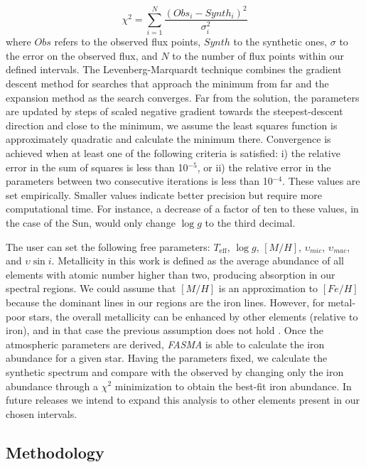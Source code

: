 \documentclass[fleqn,usenatbib]{mnras}
\begin{document}
\begin{equation}\label{x2} 
\chi^{2} = \sum_{i=1}^{N} \frac{(Obs _{i} - Synth _{i})^{2}}{\sigma_{i}^{2}}
\end{equation}
where $Obs$ refers to the observed flux points, $Synth$ to the synthetic ones, $\sigma$ to the error on the observed flux, and $N$ to the number of flux points within our defined intervals. 
The Levenberg-Marquardt technique combines the gradient descent method for searches that approach the minimum from far and the expansion method as the search converges.
Far from the solution, the parameters are updated by steps of scaled negative gradient towards the steepest-descent direction and close to the minimum, we assume the least squares function 
is approximately quadratic and calculate the minimum there. Convergence is achieved when at least one of the following criteria is satisfied: i) the relative error in the sum of squares is less 
than 10$^{-5}$, or ii) the relative error in the parameters between two consecutive iterations is less than 10$^{-4}$. These values are set empirically. 
Smaller values indicate better precision but require more computational time. For instance, a decrease of a factor of ten to these values, in the case of the Sun, would only change 
$\log g$ to the third decimal.

The user can set the following free parameters: $T_{\mathrm{eff}}$, $\log g$, $[M/H]$, $\upsilon_{mic}$, $\upsilon_{mac}$, and $\upsilon\sin i$. 
Metallicity in this work is defined as the average abundance of all elements with atomic number higher than two, producing absorption in our spectral regions. 
We could assume that $[M/H]$ is an approximation to $[Fe/H]$ because the dominant lines in our regions are the iron lines. 
However, for metal-poor stars, the overall metallicity can be enhanced by other elements (relative to iron), and in that case the previous assumption does 
not hold \citep[e.g.][]{adibekyan12}. 
Once the atmospheric parameters are derived, \textit{FASMA} is able to calculate the iron abundance for a given star. Having the parameters fixed, 
we calculate the synthetic spectrum and compare with the observed by changing only the iron abundance through a $\chi^{2}$ minimization to obtain the best-fit iron abundance. 
In future releases we intend to expand this analysis to other elements present in our chosen intervals.

\subsection{Methodology}\label{methodology}
\end{document}
